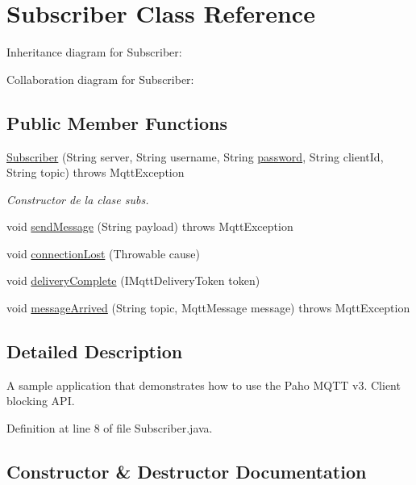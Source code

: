 \hypertarget{class_subscriber}{}\section{Subscriber Class Reference}
\label{class_subscriber}


Inheritance diagram for Subscriber\+:


Collaboration diagram for Subscriber\+:
\subsection*{Public Member Functions}
\begin{DoxyCompactItemize}
\item 
\mbox{\hyperlink{class_subscriber_a464df1ae4bb33aa9ccd4a30cff967932}{Subscriber}} (String server, String username, String \mbox{\hyperlink{mqtt__esp8266_8cpp_aa4a2ebcb494493f648ae1e6975672575}{password}}, String client\+Id, String topic)  throws Mqtt\+Exception 
\begin{DoxyCompactList}\small\item\em Constructor de la clase subs. \end{DoxyCompactList}\item 
void \mbox{\hyperlink{class_subscriber_a5cc61195bc5c75af73641d7f5b180bc3}{send\+Message}} (String payload)  throws Mqtt\+Exception 
\item 
void \mbox{\hyperlink{class_subscriber_af23525af9948928256a84c1b7aafc089}{connection\+Lost}} (Throwable cause)
\item 
void \mbox{\hyperlink{class_subscriber_a4388b1af8842ea5da82f32907763d1da}{delivery\+Complete}} (I\+Mqtt\+Delivery\+Token token)
\item 
void \mbox{\hyperlink{class_subscriber_a2d2a1601b617c73fd30fe6b70ed32482}{message\+Arrived}} (String topic, Mqtt\+Message message)  throws Mqtt\+Exception 
\end{DoxyCompactItemize}


\subsection{Detailed Description}
A sample application that demonstrates how to use the Paho M\+Q\+TT v3. Client blocking A\+PI. 

Definition at line 8 of file Subscriber.\+java.



\subsection{Constructor \& Destructor Documentation}
\mbox{\label{class_subscriber_a464df1ae4bb33aa9ccd4a30cff967932}} 
